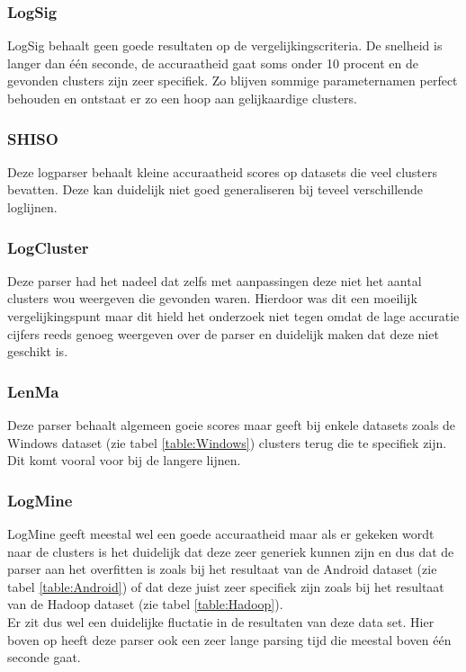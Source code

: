 \subsubsection{LogSig}
LogSig behaalt geen goede resultaten op de vergelijkingscriteria. De snelheid is langer dan één seconde, de accuraatheid gaat soms onder 10 procent en de gevonden clusters zijn zeer specifiek. Zo blijven sommige parameternamen perfect behouden en ontstaat er zo een hoop aan gelijkaardige clusters.

\subsubsection{SHISO}
Deze logparser behaalt kleine accuraatheid scores op datasets die veel clusters bevatten. Deze kan duidelijk niet goed generaliseren bij teveel verschillende loglijnen.

\subsubsection{LogCluster}
Deze parser had het nadeel dat zelfs met aanpassingen deze niet het aantal clusters wou weergeven die gevonden waren. Hierdoor was dit een moeilijk vergelijkingspunt maar dit hield het onderzoek niet tegen omdat de lage accuratie cijfers reeds genoeg weergeven over de parser en duidelijk maken dat deze niet geschikt is.

\subsubsection{LenMa}
Deze parser behaalt algemeen goeie scores maar geeft bij enkele datasets zoals de Windows dataset (zie tabel \ref{table:Windows}) clusters terug die te specifiek zijn. Dit komt vooral voor bij de langere lijnen.

\subsubsection{LogMine}
LogMine geeft meestal wel een goede accuraatheid maar als er gekeken wordt naar de clusters is het duidelijk dat deze zeer generiek kunnen zijn en dus dat de parser aan het overfitten is zoals bij het resultaat van de Android dataset (zie tabel \ref{table:Android}) of dat deze juist zeer specifiek zijn zoals bij het resultaat van de Hadoop dataset (zie tabel \ref{table:Hadoop}).\\

Er zit dus wel een duidelijke fluctatie in de resultaten van deze data set. Hier boven op heeft deze parser ook een zeer lange parsing tijd die meestal boven één seconde gaat.

